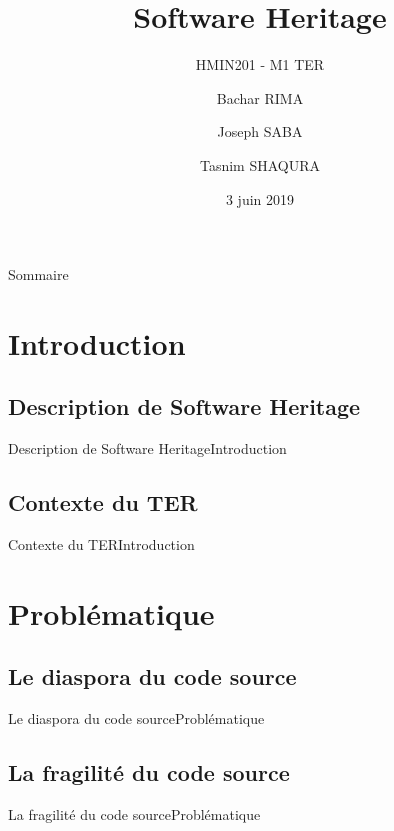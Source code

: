 \documentclass{beamer}
\title{Software Heritage}
\subtitle{HMIN201 - M1 TER}
\author{Bachar RIMA \and Joseph SABA \and Tasnim SHAQURA}
\institute[UM]{M1 AIGLE}
\date{3 juin 2019}
\begin{document}
\begin{frame}
  \titlepage
\end{frame}

\begin{frame}{Sommaire}
  \tableofcontents[hideallsubsections]
\end{frame}

\section{Introduction}

  \subsection{Description de Software Heritage}
    \begin{frame}{Description de Software Heritage}{Introduction}
    \end{frame}

  \subsection{Contexte du TER}
    \begin{frame}{Contexte du TER}{Introduction}
    \end{frame}

\section{Problématique}

  \subsection{Le diaspora du code source}
    \begin{frame}{Le diaspora du code source}{Problématique}
    \end{frame}

  \subsection{La fragilité du code source}
    \begin{frame}{La fragilité du code source}{Problématique}
    \end{frame}
\end{document}
